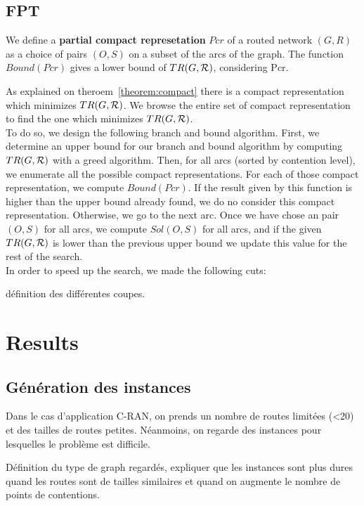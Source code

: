 \documentclass[english]{article}
\begin{document}
 
\subsection{FPT}
We define a \textbf{partial compact represetation} $Pcr$ of a routed network $(G,R)$ as a choice of pairs $(O,S)$ on a subset of the arcs of the graph.
The function $Bound(Pcr)$ gives a lower bound of $TR(G,{\cal R})$, considering Pcr.


 As explained on theroem~\ref{theorem:compact} there is a compact representation which minimizes $TR(G,{\cal R})$. We browse the entire set of compact representation to find the one which minimizes $TR(G,{\cal R})$.\\
 To do so, we design the following branch and bound algorithm. First, we determine an upper bound for our branch and bound algorithm by computing $TR(G,{\cal R})$ with a greed algorithm. Then, for all arcs (sorted by contention level), we enumerate all the possible compact representations. For each of those compact representation, we compute $Bound(Pcr)$. If the result given by this function is higher than the upper bound already found, we do no consider this compact representation. Otherwise, we go to the next arc. Once we have chose an pair $(O,S)$ for all arcs, we compute $Sol(O,S)$ for all arcs, and if the given $TR(G,{\cal R})$ is lower than the previous upper bound we update this value for the rest of the search.\\


In order to speed up the search, we made the following cuts:

définition des différentes coupes.\\
\section{Results}




\subsection{Génération des instances}
Dans le cas d'application C-RAN, on prends un nombre de routes limitées (<20) et des tailles de routes petites. Néanmoins, on regarde des instances pour lesquelles le problème est difficile.\

Définition du type de graph regardés, expliquer que les instances sont plus dures quand les routes sont de tailles similaires et quand on augmente le nombre de points de contentions.\\
\
\end{document}
